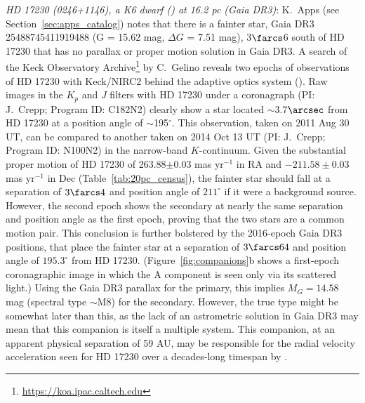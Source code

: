 \documentclass[twocolumn,tighten,twocolappendix]{aastex631}
\begin{document}
{\it HD 17230 (0246+1146), a K6 dwarf (\citealt{gray2003}) at 16.2 pc (Gaia DR3)}: K.\ Apps (see Section~\ref{sec:apps_catalog}) notes that there is a fainter star, Gaia DR3 25488745411919488 (G = 15.62 mag, $\Delta{G}$ = 7.51 mag), 3$\farcs$6 south of HD 17230 that has no parallax or proper motion solution in Gaia DR3. A search of the Keck Observatory Archive\footnote{\url {https://koa.ipac.caltech.edu}} by C.\ Gelino reveals two epochs of observations of HD 17230 with Keck/NIRC2 behind the adaptive optics system (\citealt{wizinowich2000}).  Raw images in the $K_p$ and $J$ filters with HD 17230 under a coronagraph (PI: J.\ Crepp; Program ID: C182N2) clearly show a star located $\sim$3.7$\arcsec$ from HD 17230 at a position angle of $\sim$195$^\circ$. This observation, taken on 2011 Aug 30 UT, can be compared to another taken on 2014 Oct 13 UT (PI: J.\ Crepp; Program ID: N100N2) in the narrow-band $K$-continuum. Given the substantial proper motion of HD 17230 of 263.88$\pm$0.03 mas yr$^{-1}$ in RA and $-211.58{\pm}0.03$ mas yr$^{-1}$ in Dec (Table~\ref{tab:20pc_census}), the fainter star should fall at a separation of $3{\farcs}4$ and position angle of $211^\circ$ if it were a background source. However, the second epoch shows the secondary at nearly the same separation and position angle as the first epoch, proving that the two stars are a common motion pair. This conclusion is further bolstered by the 2016-epoch Gaia DR3 positions, that place the fainter star at a separation of $3{\farcs}64$ and position angle of  $195.3^\circ$ from HD 17230. (Figure~\ref{fig:companions}b shows a first-epoch coronagraphic image in which the A component is seen only via its scattered light.) Using the Gaia DR3 parallax for the primary, this implies $M_G = 14.58$ mag (spectral type $\sim$M8) for the secondary. However, the true type might be somewhat later than this, as the lack of an astrometric solution in Gaia DR3 may mean that this companion is itself a multiple system. This companion, at an apparent physical separation of 59 AU, may be responsible for the radial velocity acceleration seen for HD 17230 over a decades-long timespan by \cite{rosenthal2021}.
\end{document}
